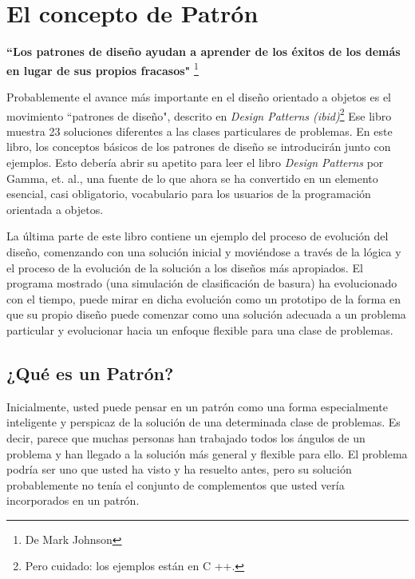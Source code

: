 \section*{El concepto de Patrón}
\label{sec:ecp}
\begin{center}
\textbf{“Los patrones de diseño ayudan a aprender de los éxitos de los demás en lugar de sus propios fracasos"} \footnote{De Mark Johnson}\\
\end{center}

Probablemente el avance más importante en el diseño orientado a objetos es el movimiento “patrones de diseño", descrito en \textit{Design Patterns (ibid)}\footnote{Pero cuidado: los ejemplos están en C ++.} Ese libro muestra 23 soluciones diferentes a las clases particulares de problemas. En este libro, los conceptos básicos de los patrones de diseño se introducirán junto con ejemplos. 
Esto debería abrir su apetito para leer el libro \textit{Design Patterns} por Gamma, et. al., una fuente de lo que ahora se ha convertido en un elemento esencial, casi obligatorio, vocabulario para los usuarios de la programación orientada a objetos.\newline

La última parte de este libro contiene un ejemplo del proceso de evolución del diseño, comenzando con una solución inicial y moviéndose a través de la lógica y el proceso de la evolución de la solución a los diseños más apropiados. El programa mostrado (una simulación de clasificación de basura) ha evolucionado con el tiempo, puede mirar en dicha evolución como un prototipo de la forma en que su propio diseño puede comenzar como una solución adecuada a un problema particular  y evolucionar hacia un enfoque flexible para una clase de problemas.

\subsection*{¿Qué es un Patrón?}
\label{subsec:qeup}

Inicialmente, usted puede pensar en un patrón como una forma especialmente inteligente y perspicaz de la solución de una determinada clase de problemas. Es decir, parece que muchas personas han trabajado todos los ángulos de un problema y han llegado a la solución más general y flexible para ello. El problema podría ser uno que usted ha visto y ha resuelto antes, pero su solución probablemente no tenía el conjunto de complementos que usted vería incorporados en un patrón.    \newline

